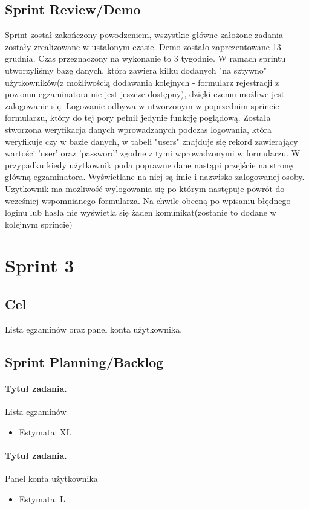 \documentclass[a4paper]{article}
\begin{document}
\subsection{Sprint Review/Demo}
Sprint został zakończony powodzeniem, wszystkie główne założone zadania zostały zrealizowane w ustalonym czasie.  Demo zostało zaprezentowane 13 grudnia. Czas przeznaczony na wykonanie to 3 tygodnie. W ramach sprintu utworzyliśmy bazę danych, która zawiera kilku dodanych "na sztywno" użytkowników(z możliwością dodawania kolejnych - formularz rejestracji z poziomu egzaminatora nie jest jeszcze dostępny), dzięki czemu możliwe jest zalogowanie się. Logowanie odbywa w utworzonym w poprzednim sprincie formularzu, który do tej pory pełnił jedynie funkcję poglądową. Została stworzona weryfikacja danych wprowadzanych podczas logowania, która weryfikuje czy w bazie danych, w tabeli "users" znajduje się rekord zawierający wartości 'user' oraz 'password' zgodne z tymi wprowadzonymi w formularzu. W przypadku kiedy użytkownik  poda poprawne dane nastąpi przejście na stronę główną egzaminatora. Wyświetlane na niej są imie i nazwisko zalogowanej osoby. Użytkownik ma możliwość wylogowania się po którym następuje powrót do wcześniej wspomnianego formularza. Na chwile obecną po wpisaniu błędnego loginu lub hasła nie wyświetla się żaden komunikat(zostanie to dodane w kolejnym sprincie)

\section{Sprint 3}

\subsection{Cel}  Lista egzaminów oraz panel konta użytkownika.

\subsection{Sprint Planning/Backlog}

\paragraph{Tytuł zadania.} Lista egzaminów
\begin{itemize}
\item Estymata: XL
\end{itemize} 

\paragraph{Tytuł zadania.} Panel konta użytkownika
\begin{itemize}
\item Estymata: L
\end{itemize} 
\end{document}
